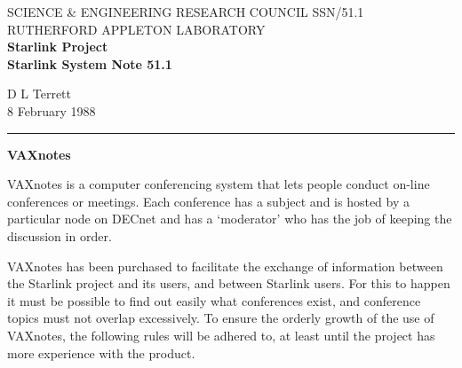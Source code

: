 \pagestyle{myheadings}
\setlength{\textwidth}{160mm}
\setlength{\textheight}{240mm}
\setlength{\topmargin}{-5mm}
\setlength{\oddsidemargin}{0mm}
\setlength{\evensidemargin}{0mm}
\setlength{\parindent}{0mm}
\setlength{\parskip}{\medskipamount}
\setlength{\unitlength}{1mm}


\thispagestyle{empty}
SCIENCE \& ENGINEERING RESEARCH COUNCIL \hfill SSN/51.1\\
RUTHERFORD APPLETON LABORATORY\\
{\large\bf Starlink Project\\}
{\large\bf Starlink System Note 51.1}
\begin{flushright}
D L Terrett\\
8 February 1988
\end{flushright}
\vspace{-4mm}
\rule{\textwidth}{0.5mm}
\vspace{5mm}
\begin{center}
{\Large\bf VAXnotes}
\end{center}
\vspace{5mm}

VAXnotes is a computer conferencing system that lets people conduct on-line
conferences or meetings. Each conference has a subject and is hosted by
a particular node on DECnet and has a `moderator' who has the job of keeping
the discussion in order.

VAXnotes has been purchased to facilitate the exchange of information between
the Starlink project and its users, and between Starlink users. For this to
happen it must be possible to find out easily what conferences exist, and
conference topics must not overlap excessively. To ensure the orderly growth of
the use of VAXnotes, the following rules will be adhered to, at least until the
project has more experience with the product. 

